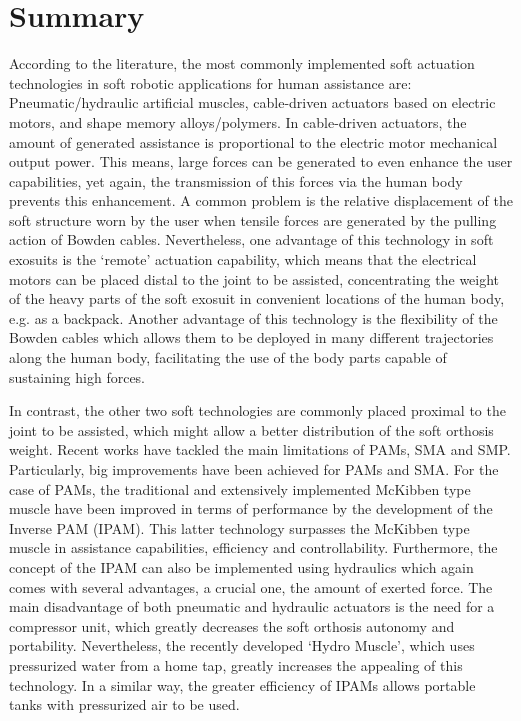 \section{Summary}

According to the literature, the most commonly implemented soft actuation technologies in soft robotic applications for human assistance are: Pneumatic/hydraulic artificial muscles, cable-driven actuators based on electric motors, and shape memory alloys/polymers.  In cable-driven actuators, the amount of generated assistance is proportional to the electric motor mechanical output power. This means, large forces can be generated to even enhance the user capabilities, yet again, the transmission of this forces via the human body prevents this enhancement. A common problem is the relative displacement of the soft structure worn by the user when tensile forces are generated by the pulling action of Bowden cables. Nevertheless, one advantage of this technology in soft exosuits is the `remote' actuation capability, which means that the electrical motors can be placed distal to the joint to be assisted, concentrating the weight of the heavy parts of the soft exosuit in convenient locations of the human body, e.g. as a backpack. Another advantage of this technology is the flexibility of the Bowden cables which allows them to be deployed in many different trajectories along the human body, facilitating the use of the body parts capable of sustaining high forces.

In contrast, the other two soft technologies are commonly placed proximal to the joint to be assisted, which might allow a better distribution of the soft orthosis weight. Recent works have tackled the main limitations of PAMs, SMA and SMP. Particularly, big improvements have been achieved for PAMs and SMA. For the case of PAMs, the traditional and extensively implemented McKibben type muscle have been improved in terms of performance by the development of the Inverse PAM (IPAM). This latter technology surpasses the McKibben type muscle in assistance capabilities, efficiency and controllability. Furthermore, the concept of the IPAM can also be implemented using hydraulics which again comes with several advantages, a crucial one, the amount of exerted force. The main disadvantage of both pneumatic and hydraulic actuators is the need for a compressor unit, which greatly decreases the soft orthosis autonomy and portability. Nevertheless, the recently developed `Hydro Muscle', which uses pressurized water from a home tap, greatly increases the appealing of this technology. In a similar way, the greater efficiency of IPAMs allows portable tanks with pressurized air to be used.

